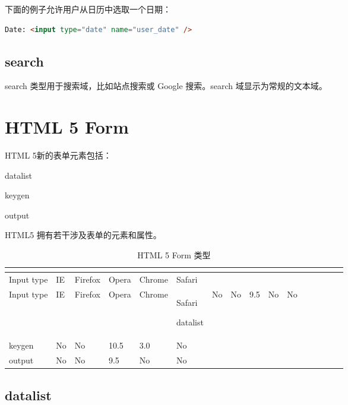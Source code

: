 下面的例子允许用户从日历中选取一个日期：

\begin{lstlisting}[language=HTML]
Date: <input type="date" name="user_date" />
\end{lstlisting}

\subsection{search}


search 类型用于搜索域，比如站点搜索或 Google 搜索。search 域显示为常规的文本域。




\section{HTML 5 Form}


HTML 5新的表单元素包括：

\begin{compactitem}
\item datalist
\item keygen
\item output
\end{compactitem}



HTML5 拥有若干涉及表单的元素和属性。


\begin{longtable}{|p{80pt}|p{50pt}|p{50pt}|p{50pt}|p{50pt}|p{50pt}|}
\tabularnewline\hline
Input type	&IE	&Firefox	&Opera	&Chrome	&Safari
\endhead

\caption{HTML 5 Form 类型}\\
\hline
Input type	&IE	&Firefox	&Opera	&Chrome	&Safari
\endfirsthead

\endfoot

\endlastfoot
\hline
datalist	&No		&No		&9.5	&No		&No\\
\hline
keygen	&No		&No		&10.5	&3.0	&No\\
\hline
output	&No		&No		&9.5	&No		&No\\
\hline

\end{longtable}



\subsection{datalist}


